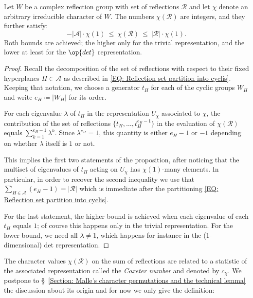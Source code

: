 \begin{prop}\label{Prop: bounds for chi(R)}
Let $W$ be a complex reflection group with set of reflections $\mathcal{R}$ and let $\chi$ denote an arbitrary irreducible character of $W$. The numbers $\chi(\mathcal{R})$ are integers, and they further satisfy: $$-|\mathcal{A}|\cdot\chi(1)\ \leq\ \chi(\mathcal{R})\  \leq\ |\mathcal{R}|\cdot\chi(1).$$ Both bounds are achieved; the higher only for the trivial representation, and the lower at least for the $\op{det}$ representation.
\end{prop}
\begin{proof}
Recall the decomposition of the set of reflections with respect to their fixed hyperplanes $H\in\mathcal{A}$ as described in \eqref{EQ: Reflection set partition into cyclis}. Keeping that notation, we choose a generator $t_H$ for each of the cyclic groups $W_H$ and write $e_H\coloneqq |W_H|$ for its order.

For each eigenvalue $\lambda$ of $t_H$ in the representation $U_{\chi}$ associated to $\chi$, the contribution of the set of reflections $\{t_H,\ldots,t_H^{e_H-1}\}$ in the evaluation of $\chi(\mathcal{R})$ equals $\sum_{k=1}^{e_H-1}\lambda^k$. Since $\lambda^{e_H}=1$, this quantity is either $e_H-1$ or $-1$ depending on whether $\lambda$ itself is $1$ or not. 

This implies the first two statements of the proposition, after noticing that the multiset of eigenvalues of $t_H$ acting on $U_{\chi}$ has $\chi(1)$-many elements. In particular, in order to recover the second inequality we use that $\sum_{H\in\mathcal{A}}(e_H-1)=|\mathcal{R}|$ which is immediate after the partitioning \eqref{EQ: Reflection set partition into cyclis}.

For the last statement, the higher bound is achieved when each eigenvalue of each $t_H$ equals $1$; of course this happens only in the trivial representation. For the lower bound, we need all $\lambda\neq 1$, which happens for instance in the ($1$-dimensional) det representation. 
\end{proof}


The character values $\chi(\mathcal{R})$ on the sum of reflections are related to a statistic of the associated representation called the {\it Coxeter number} and denoted by $c_{\chi}$. We postpone to \S~\ref{Section: Malle's character permutations and the technical lemma} the discussion about its origin and for now we only give the definition:

